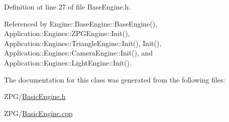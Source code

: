 Definition at line 27 of file Base\+Engine.\+h.



Referenced by Engine\+::\+Base\+Engine\+::\+Base\+Engine(), Application\+::\+Engines\+::\+Z\+P\+G\+Engine\+::\+Init(), Application\+::\+Engines\+::\+Triangle\+Engine\+::\+Init(), Init(), Application\+::\+Engines\+::\+Camera\+Engine\+::\+Init(), and Application\+::\+Engines\+::\+Light\+Engine\+::\+Init().



The documentation for this class was generated from the following files\+:\begin{DoxyCompactItemize}
\item 
Z\+P\+G/\mbox{\hyperlink{BasicEngine_8h}{Basic\+Engine.\+h}}\item 
Z\+P\+G/\mbox{\hyperlink{BasicEngine_8cpp}{Basic\+Engine.\+cpp}}\end{DoxyCompactItemize}
